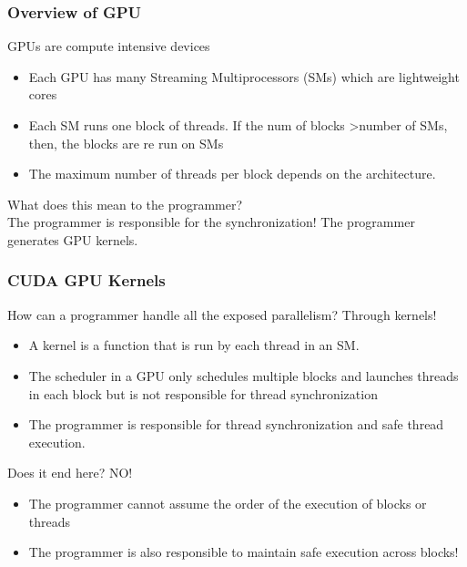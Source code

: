 \documentclass[mathserif]{beamer}
\begin{document}
\begin{frame}                                                                                                                                                                          
\frametitle{Overview of GPU}
GPUs are compute intensive devices
\begin{itemize}
\item Each GPU has many Streaming Multiprocessors (SMs) which are lightweight cores  
\item Each SM runs one block of threads. If the num of blocks \textgreater  number of SMs, then, the blocks are re run on SMs
\item The maximum number of threads per block depends on the architecture.  
\end{itemize}
What does this mean to the programmer? \\
The programmer is responsible for the synchronization!
The programmer generates GPU kernels. 
\end{frame}              

\begin{frame}                                                                                                                                                                          
\frametitle{CUDA GPU Kernels}
How can a programmer handle all the exposed parallelism? Through kernels!
\begin{itemize}
\item A kernel is a function that is run by each thread in an SM.  
\item The scheduler in a GPU only schedules multiple blocks and launches threads in each block but is not responsible for thread synchronization 
\item The programmer is responsible for thread synchronization and safe thread execution.  
\end{itemize}
Does it end here? NO!
\begin{itemize}
\item The programmer cannot assume the order of the execution of blocks or threads 
\item The programmer is also responsible to maintain safe execution across blocks! 
\end{itemize} 
\end{frame}              
\end{document}
